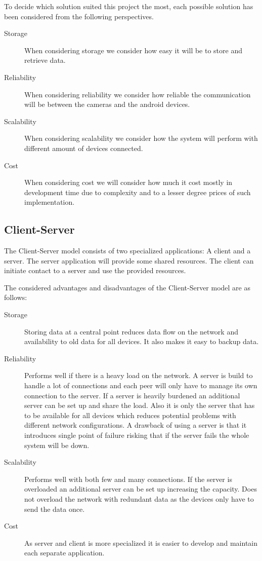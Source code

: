 To decide which solution suited this project the most, each possible solution has been considered from the following perspectives.

\begin{description}
\item[Storage] When considering storage we consider how easy it will be to store and retrieve data.
\item[Reliability] When considering reliability we consider how reliable the communication will be between the cameras and the android devices.
\item[Scalability] When considering scalability we consider how the system will perform with different amount of devices connected.
\item[Cost] When considering cost we will consider how much it cost mostly in development time due to complexity and to a lesser degree prices of such implementation.
\end{description}

\subsection{Client-Server}
The Client-Server model consists of two specialized applications: A client and a server. The server application will provide some shared resources. The client can initiate contact to a server and use the provided resources.

The considered advantages and disadvantages of the Client-Server model are as follows:

\begin{description}
\item[Storage] Storing data at a central point reduces data flow on the network and availability to old data for all devices. It also makes it easy to backup data.

\item[Reliability] Performs well if there is a heavy load on the network. A server is build to handle a lot of connections and each peer will only have to manage its own connection to the server. If a server is heavily burdened an additional server can be set up and share the load. Also it is only the server that has to be available for all devices which reduces potential problems with different network configurations. A drawback of using a server is that it introduces single point of failure risking that if the server fails the whole system will be down.

\item[Scalability] Performs well with both few and many connections. If the server is overloaded an additional server can be set up increasing the capacity. Does not overload the network with redundant data as the devices only have to send the data once.

\item[Cost] As server and client is more specialized it is easier to develop and maintain each separate application. 
\end{description}

